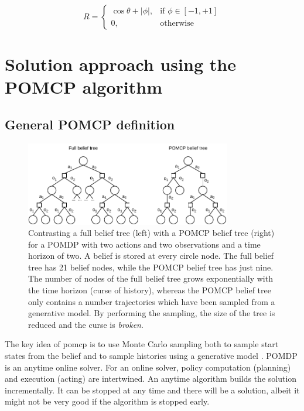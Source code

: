 \begin{equation}
    \label{eq:reward}
    R = 
    \begin{cases}
        \cos \theta + |\phi|,& \text{if } \phi \in [-1,+1]\\
        0,              & \text{otherwise}
    \end{cases}
\end{equation}

\section{Solution approach using the POMCP algorithm}

\subsection{General POMCP definition}
\label{sec:pomcp}

\begin{figure}[htbp]
    \centering
    \includegraphics[width=0.8\textwidth]{figures/pomcp_belief_tree.pdf}
    \caption[A full belief tree in contrast with a POMCP belief tree]{Contrasting a full belief tree (left) with a POMCP belief tree (right) for a POMDP with two actions and two observations and a time horizon of two. A belief is stored at every circle node. The full belief tree has 21 belief nodes, while the POMCP belief tree has just nine. The number of nodes of the full belief tree grows exponentially with the time horizon (curse of history), whereas the POMCP belief tree only contains a number trajectories which have been sampled from a generative model. By performing the sampling, the size of the tree is reduced and the curse is \textit{broken}.}
    \label{fig:full_vs_pomcp}
\end{figure}

The key idea of \Gls{pomcp} is to use Monte Carlo sampling both to sample start states from the belief and to sample histories using a generative model \parencite{pomcp}. POMDP is an anytime online solver. For an online solver, policy computation (planning) and execution (acting) are intertwined. An anytime algorithm builds the solution incrementally. It can be stopped at any time and there will be a solution, albeit it might not be very good if the algorithm is stopped early.

